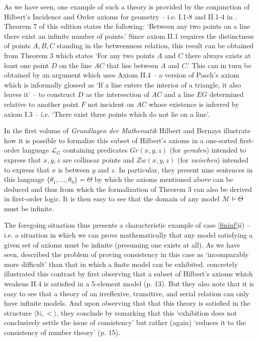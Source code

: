 \documentclass[11pt,fleqn,leqno]{article}
\begin{document}
As we have seen, one example of such a theory is provided by the conjunction of Hilbert's Incidence and Order axioms for geometry -- i.e. I.1-8 and II.1-4 in \citep{Hilbert1971}.  Theorem 7 of this edition states the following: `Between any two points on a line there exist an infinite number of points.'   Since axiom II.1 requires the distinctness of points $A,B,C$ standing in the betweenness relation, this result can be obtained from Theorem 3 which states `For any two points $A$ and $C$ there always exists at least one point $D$ on the line $AC$ that lies between $A$ and $C$.'  This can in turn be obtained by an argument which uses Axiom II.4 -- a version of Pasch's axiom which is informally glossed as `If a line enters the interior of a triangle, it also leaves it'  -- to construct $D$ as the intersection of $AC$ and a line $EG$ determined relative to another point $F$ not incident on $AC$ whose existence is inferred by axiom I.3 -- i.e. `There exist three points which do not lie on a line'.  

In the first volume of \textsl{Grundlagen der Mathematik} \citeyearpar[pp. 5-6]{Hilbert1934} Hilbert and Bernays illustrate how it is possible to formalize this subset of Hilbert's axioms in a one-sorted first-order language $\mathcal{L}_G$ containing predicates $Gr(x,y,z)$ (for \textsl{geraden}) intended to express that $x,y,z$ are collinear points and $Zw(x,y,z)$ (for \textsl{zwischen}) intended to express that $x$ is between $y$ and $z$.  In particular, they present nine sentences in this language $\{\theta_1,\ldots,\theta_9\} = \Theta$ by which the axioms mentioned above can be deduced and thus from which the formalization of Theorem 3 can also be derived in first-order logic.   It is then easy to see that the domain of any model $\mathcal{M} \models \Theta$ must be infinite.    

The foregoing situation thus presents a characteristic example of case \ref{fininf}ii) -- i.e. a situation in which we can prove mathematically that any model satisfying a given set of axioms must be infinite (presuming one exists at all).   As we have seen, \citet{Hilbert1928} described the problem of proving consistency in this case as `incomparably more difficult' than that in which a finite model can be exhibited.   \citet{Hilbert1934} concretely illustrated this contrast by first observing that a subset of Hilbert's axioms which weakens II.4 is satisfied in a 5-element model (p. 13).  But they also note that it is easy to see that a theory of an irreflexive, transitive, and serial relation can only have infinite models.  And upon observing that that this theory is satisfied in the structure $\langle \mathbb{N}, < \rangle$, they conclude by remarking that this `exhibition does not conclusively settle the issue of consistency' but rather (again) `reduces it to the consistency of number theory' (p. 15).  
\end{document}

